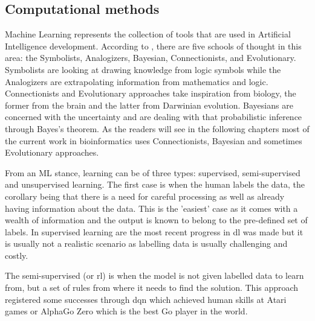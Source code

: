 \subsection{Computational methods} \label{s:lit:computational}

\vspace{3mm}
\vspace{3mm}

Machine Learning represents the collection of tools that are used in Artificial Intelligence development. According to \citet{Domingos_Pedro2015-xr}, there are five schools of thought in this area: the Symbolists, Analogizers, Bayesian, Connectionists, and Evolutionary. Symbolists are looking at drawing knowledge from logic symbols while the Analogizers are extrapolating information from mathematics and logic\cite{Domingos_Pedro2015-xr}. Connectionists and Evolutionary approaches take inspiration from biology, the former from the brain and the latter from Darwinian evolution. Bayesians are concerned with the uncertainty and are dealing with that probabilistic inference through Bayes's theorem\cite{Domingos_Pedro2015-xr}. As the readers will see in the following chapters most of the current work in bioinformatics uses Connectionists, Bayesian and sometimes Evolutionary approaches.

From an ML stance, learning can be of three types: supervised, semi-supervised and unsupervised learning. The first case is when the human labels the data, the corollary being that there is a need for careful processing as well as already having information about the data. This is the 'easiest' case as it comes with a wealth of information and the output is known to belong to the pre-defined set of labels. In supervised learning are the most recent progress in \acrfull{dl} was made but it is usually not a realistic scenario as labelling data is usually challenging and costly. 

The semi-supervised (or \acrfull{rl}) is when the model is not given labelled data to learn from, but a set of rules from where it needs to find the solution. This approach registered some successes through \acrfull{dqn} which achieved human skills at Atari games\cite{Mnih2015-cw} or AlphaGo Zero\cite{Silver2017-sw} which is the best Go player in the world. 

